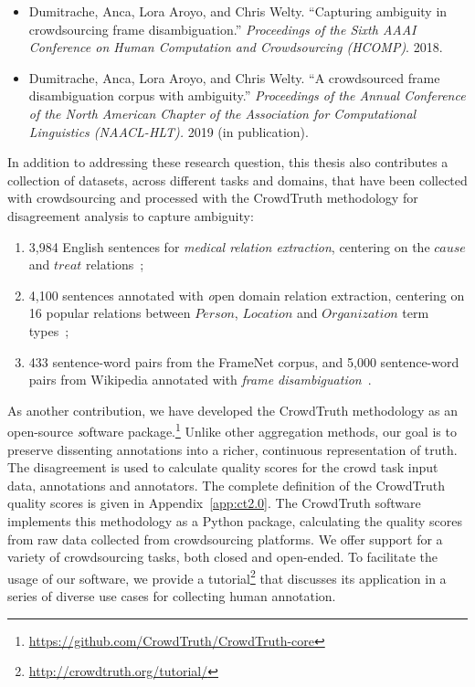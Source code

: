 \begin{itemize}
    \begin{itemize}
        \item Dumitrache, Anca, Lora Aroyo, and Chris Welty. ``Capturing ambiguity in crowdsourcing frame disambiguation.'' \textit{Proceedings of the Sixth AAAI Conference on Human Computation and Crowdsourcing (HCOMP)}. 2018.~\cite{DBLP:conf/hcomp/DumitracheAW18}
        \item Dumitrache, Anca, Lora Aroyo, and Chris Welty. ``A crowdsourced frame disambiguation corpus with ambiguity.'' \textit{Proceedings of the Annual Conference of the North American Chapter of the Association for Computational Linguistics (NAACL-HLT).} 2019 (in publication).~\cite{dumitrache2019frames}
    \end{itemize}
\end{itemize}

In addition to addressing these research question, this thesis also contributes a collection of datasets, across different tasks and domains, that have been collected with crowdsourcing and processed with the CrowdTruth methodology for disagreement analysis to capture ambiguity:

\begin{enumerate}
    \item 3,984 English sentences for \textit{medical relation extraction}, centering on the $cause$ and $treat$ relations~\cite{anca_dumitrache_2016_50676};
    
    \item 4,100 sentences annotated with {\textit open domain relation extraction}, centering on 16 popular relations between $Person$, $Location$ and $Organization$ term types~\cite{crowdODrelexdata2016};
    
    \item 433 sentence-word pairs from the FrameNet corpus, and 5,000 sentence-word pairs from Wikipedia annotated with \textit{frame disambiguation}~\cite{anca_dumitrache_2018_1472345}.
\end{enumerate}


As another contribution, we have developed the CrowdTruth methodology as an open-source {\textit software package}.\footnote{\url{https://github.com/CrowdTruth/CrowdTruth-core}} Unlike other aggregation methods, our goal is to preserve dissenting annotations into a richer, continuous representation of truth. The disagreement is used to calculate quality scores for the crowd task input data, annotations and annotators. The complete definition of the CrowdTruth quality scores is given in Appendix~\ref{app:ct2.0}. The CrowdTruth software implements this methodology as a Python package, calculating the quality scores from raw data collected from crowdsourcing platforms. We offer support for a variety of crowdsourcing tasks, both closed and open-ended.  To facilitate the usage of our software, we provide a tutorial\footnote{\url{http://crowdtruth.org/tutorial/}} that discusses its application in a series of diverse use cases for collecting human annotation.





